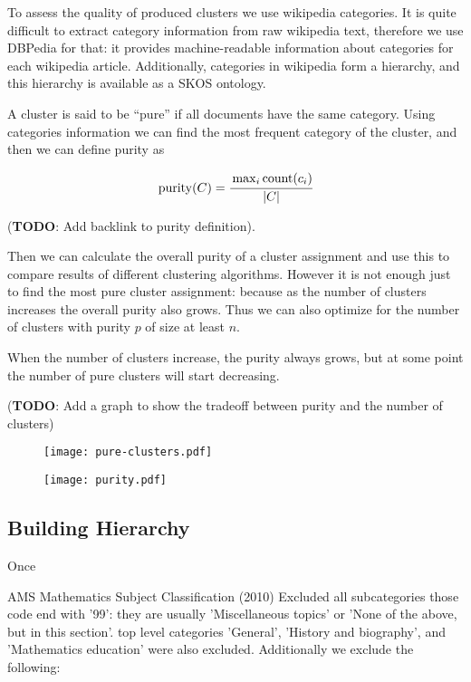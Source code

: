 To assess the quality of produced clusters we use wikipedia categories. It is 
quite difficult to extract category information from raw wikipedia text,
therefore we use DBPedia \cite{bizer2009dbpedia} for that: it provides 
machine-readable information about categories for each wikipedia article. 
Additionally, categories in wikipedia form a hierarchy, and this hierarchy 
is available as a SKOS ontology. 

A cluster is said to be ``pure'' if all documents have the same category. 
Using categories information we can find the most frequent category of the 
cluster, and then we can define purity as 

$$\operatorname{purity}(C) = \cfrac{\max_i \operatorname{count}(c_i)}{|C|}$$

(\textbf{TODO}: Add backlink to purity definition). 

Then we can calculate the overall purity of a cluster assignment and use 
this to compare results of different clustering algorithms. However it is not 
enough just to find the most pure cluster assignment: because as the number 
of clusters increases the overall purity also grows. 
Thus we can also optimize for the number of clusters with purity $p$ of 
size at least $n$. 

When the number of clusters increase, the purity always grows, but at 
some point the number of pure clusters will start decreasing. 

(\textbf{TODO}:  Add a graph to show the tradeoff between purity and the number of clusters)


\begin{figure}[h]
\centering\texttt{[image: pure-clusters.pdf]}
\caption{}
\label{fig:k-vs-pureclusters}
\end{figure}


\begin{figure}[h]
\centering\texttt{[image: purity.pdf]}
\caption{}
\label{fig:k-vs-purity}
\end{figure}


\subsection{Building Hierarchy} \label{sec:hierarchy}


Once 

AMS Mathematics Subject Classification (2010) \cite{ams2010msc}
Excluded all subcategories those code end with '99': they are 
usually 'Miscellaneous topics' or 'None of the above, but in this section'. 
top level categories 'General', 'History and biography', and 'Mathematics education'
were also excluded. 
Additionally we exclude the following: 

